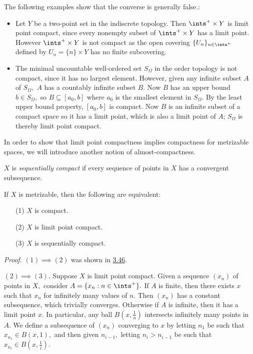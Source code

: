 The following examples show that the converse is generally false.:
\begin{itemize}
    \item Let $Y$ be a two-point set in the indiscrete topology. Then $\ints^+ \times Y$ is limit point compact, since every nonempty subset of $\ints^+ \times Y$ has a limit point. However $\ints^+ \times Y$ is not compact as the open covering $\{U_n\}_{n \in \ints^+}$ defined by $U_n = \{n\} \times Y$ has no finite subcovering.

    \item The minimal uncountable well-ordered set $S_\Omega$ in the order topology is not compact, since it has no largest element. However, given any infinite subset $A$ of $S_\Omega,$ $A$ has a countably infinite subset $B.$ Now $B$ has an upper bound $b \in S_\Omega,$ so $B \subseteq [a_0, b]$ where $a_0$ is the smallest element in $S_\Omega.$ By the least upper bound property, $[a_0, b]$ is compact. Now $B$ is an infinite subset of a compact space so it has a limit point, which is also a limit point of $A$; $S_\Omega$ is thereby limit point compact.
\end{itemize}
In order to show that limit point compactness implies compactness for metrizable spaces, we will introduce another notion of almost-compactness.
\begin{definition}\label{3.47}
    $X$ is {\it sequentially compact} if every sequence of points in $X$ has a convergent subsequence.
\end{definition}
\begin{theorem}\label{3.48}
    If $X$ is metrizable, then the following are equivalent:
    \begin{enumerate}
        \item[(1)] $X$ is compact.
        \item[(2)] $X$ is limit point compact.
        \item[(3)] $X$ is sequentially compact.
    \end{enumerate}
\end{theorem}
{\it Proof.} $(1) \implies (2)$ was shown in \hyperref[3.46]{3.46}.

$(2) \implies (3).$ Suppose $X$ is limit point compact. Given a sequence $(x_n)$ of points in $X,$ consider $A = \{x_n : n \in \ints^+\}.$ If $A$ is finite, then there exists $x$ such that $x_n$ for infinitely many values of $n.$ Then $(x_n)$ has a constant subsequence, which trivially converges. Otherwise if $A$ is infinite, then it has a limit point $x.$ In particular, any ball $B(x, \frac1n)$ intersects infinitely many points in $A.$ We define a subsequence of $(x_n)$ converging to $x$ by letting $n_1$ be such that $x_{n_1} \in B(x, 1),$ and then given $n_{i-1},$ letting $n_i > n_{i-1}$ be such that $x_{n_i} \in B(x, \frac1i).$

